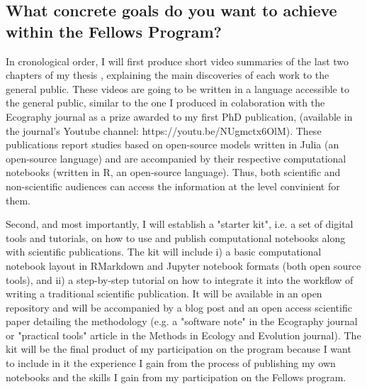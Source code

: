\documentclass[11pt,]{article}
\begin{document}
\subsection*{What concrete goals do you want to achieve within the Fellows Program?}
In cronological order, I will first produce short video summaries of the last two chapters of my thesis \cite{figueiredo_underreview, figueiredo_inprep}, explaining the main discoveries of each work to the general public.
These videos are going to be written in a language accessible to the general public, similar to the one I produced in colaboration with the Ecography journal as a prize awarded to my first PhD publication,  (available in the journal's Youtube channel: https://youtu.be/NUgmctx6OlM).
These publications report studies based on open-source models written in Julia (an open-source language) and are accompanied by their respective computational notebooks (written in R, an open-source language).
Thus, both scientific and non-scientific audiences can access the information at the level convinient for them.

Second, and most importantly, I will establish a "starter kit", i.e. a set of digital tools and tutorials, on how to use and publish computational notebooks along with scientific publications.
The kit will include i) a basic computational notebook layout in RMarkdown and Jupyter notebook formats (both open source tools), and ii) a step-by-step tutorial on how to integrate it into the workflow of writing a traditional scientific publication.
It will be available in an open repository and will be accompanied by a blog post and an open access scientific paper detailing the methodology (e.g. a "software note" in the Ecography journal or "practical tools" article in the Methods in Ecology and Evolution journal).
The kit will be the final product of my participation on the program because I want to include in it the experience I gain from the process of publishing my own notebooks and the skills I gain from my participation on the Fellows program.
\end{document}
